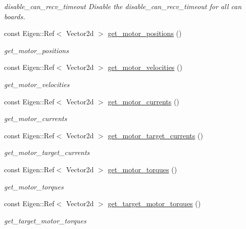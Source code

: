 \begin{DoxyCompactItemize}
\begin{DoxyCompactList}\small\item\em disable\+\_\+can\+\_\+recv\+\_\+timeout Disable the disable\+\_\+can\+\_\+recv\+\_\+timeout for all can boards. \end{DoxyCompactList}\item 
const Eigen\+::\+Ref$<$ Vector2d $>$ \hyperlink{classblmc__robots_1_1SingleLeg_a52324fdf9779bb82141e2056b222b30f}{get\+\_\+motor\+\_\+positions} ()
\begin{DoxyCompactList}\small\item\em get\+\_\+motor\+\_\+positions \end{DoxyCompactList}\item 
const Eigen\+::\+Ref$<$ Vector2d $>$ \hyperlink{classblmc__robots_1_1SingleLeg_afd9b40fdddedd93e2a92114862846a5e}{get\+\_\+motor\+\_\+velocities} ()
\begin{DoxyCompactList}\small\item\em get\+\_\+motor\+\_\+velocities \end{DoxyCompactList}\item 
const Eigen\+::\+Ref$<$ Vector2d $>$ \hyperlink{classblmc__robots_1_1SingleLeg_a6f9fea8b21a7fb58a95882ec3fe78a8d}{get\+\_\+motor\+\_\+currents} ()
\begin{DoxyCompactList}\small\item\em get\+\_\+motor\+\_\+currents \end{DoxyCompactList}\item 
const Eigen\+::\+Ref$<$ Vector2d $>$ \hyperlink{classblmc__robots_1_1SingleLeg_aeae6fa29a8a5019d11a7aab9dd443e98}{get\+\_\+motor\+\_\+target\+\_\+currents} ()
\begin{DoxyCompactList}\small\item\em get\+\_\+motor\+\_\+target\+\_\+currents \end{DoxyCompactList}\item 
const Eigen\+::\+Ref$<$ Vector2d $>$ \hyperlink{classblmc__robots_1_1SingleLeg_a11751bde3377207e56ded343e00a99f1}{get\+\_\+motor\+\_\+torques} ()
\begin{DoxyCompactList}\small\item\em get\+\_\+motor\+\_\+torques \end{DoxyCompactList}\item 
const Eigen\+::\+Ref$<$ Vector2d $>$ \hyperlink{classblmc__robots_1_1SingleLeg_a9f3277dbc3bc672e09dbdb51b7818d42}{get\+\_\+target\+\_\+motor\+\_\+torques} ()
\begin{DoxyCompactList}\small\item\em get\+\_\+target\+\_\+motor\+\_\+torques \end{DoxyCompactList}\item 

\end{DoxyCompactItemize}
